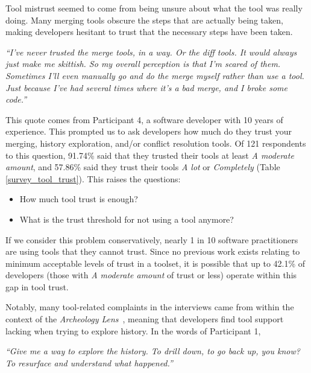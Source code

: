 Tool mistrust seemed to come from being unsure about what the tool was really doing. Many merging tools obscure the steps that are actually being taken, making developers hesitant to trust that the necessary steps have been taken. 
\begin{displayquote}
\textit{``I've never trusted the merge tools, in a way. Or the diff tools. It would always just make me skittish. So my overall perception is that I'm scared of them. Sometimes I'll even manually go and do the merge myself rather than use a tool. Just because I've had several times where it's a bad merge, and I broke some code.''}
\end{displayquote}
This quote comes from Participant 4, a software developer with 10 years of experience.
This prompted us to ask developers how much do they trust your merging, history exploration, and/or conflict resolution tools. Of 121 respondents to this question, 91.74\% said that they trusted their tools at least \textit{A moderate amount}, and 57.86\% said they trust their tools \textit{A lot} or \textit{Completely} (Table \ref{survey_tool_trust}). This raises the questions: 
\begin{itemize}
\item How much tool trust is enough? 
\item What is the trust threshold for not using a tool anymore?
\end{itemize}
If we consider this problem conservatively, nearly 1 in 10 software practitioners are using tools that they cannot trust. Since no previous work exists relating to minimum acceptable levels of trust in a toolset, it is possible that up to 42.1\% of developers (those with \textit{A moderate amount} of trust or less) operate within this gap in tool trust.



Notably, many tool-related complaints in the interviews came from within the context of the \textit{Archeology Lens}~\cite{mihai_lenses}, meaning that developers find tool support lacking when trying to explore history. In the words of Participant 1, 

\begin{displayquote}
\textit{``Give me a way to explore the history. To drill down, to go back up, you know? To resurface and understand what happened.''}
\end{displayquote}

